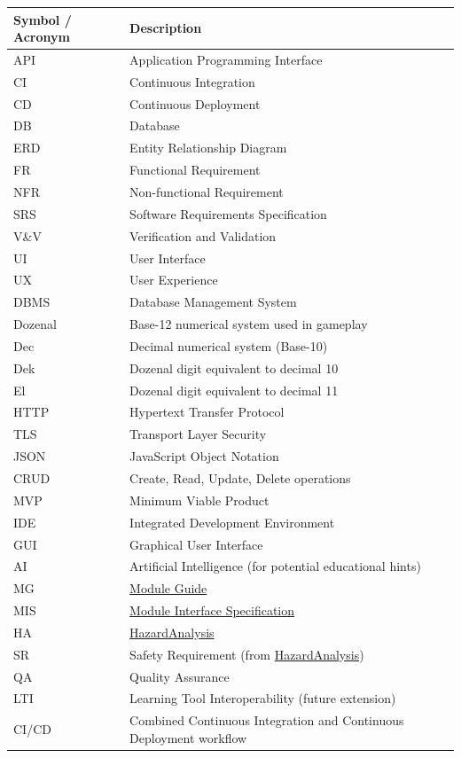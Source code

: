 \documentclass[12pt, titlepage]{article}
\begin{document}
\renewcommand{\arraystretch}{1.2}
\begin{tabularx}{\textwidth}{l X}
\toprule
\textbf{Symbol / Acronym} & \textbf{Description} \\
\midrule
API & Application Programming Interface \\
CI & Continuous Integration \\
CD & Continuous Deployment \\
DB & Database \\
ERD & Entity Relationship Diagram \\
FR & Functional Requirement \\
NFR & Non-functional Requirement \\
SRS & Software Requirements Specification \\
V\&V & Verification and Validation \\
UI & User Interface \\
UX & User Experience \\
DBMS & Database Management System \\
Dozenal & Base-12 numerical system used in gameplay \\
Dec & Decimal numerical system (Base-10) \\
Dek & Dozenal digit equivalent to decimal 10 \\
El & Dozenal digit equivalent to decimal 11 \\
HTTP & Hypertext Transfer Protocol \\
TLS & Transport Layer Security \\
JSON & JavaScript Object Notation \\
CRUD & Create, Read, Update, Delete operations \\
MVP & Minimum Viable Product \\
IDE & Integrated Development Environment \\
GUI & Graphical User Interface \\
AI & Artificial Intelligence (for potential educational hints) \\
MG & \href{../Design/SoftArchitecture/MG.pdf}{Module Guide} \\
MIS &  \href{../Design/SoftDetailedDes/MIS.pdf}{Module Interface Specification} \\
HA & \href{../HazardAnalysis/HazardAnalysis.pdf}{HazardAnalysis} \\
SR & Safety Requirement (from \href{../HazardAnalysis/HazardAnalysis.pdf}{HazardAnalysis}) \\
QA & Quality Assurance \\
LTI & Learning Tool Interoperability (future extension) \\
CI/CD & Combined Continuous Integration and Continuous Deployment workflow \\
\bottomrule
\end{tabularx}
\end{document}
